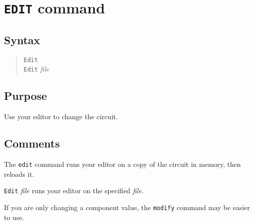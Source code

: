 %
%
%
%
\section{{\tt EDIT} command}
\subsection{Syntax}
\begin{verse}
{\tt Edit} \\
{\tt Edit} {\it file}
\end{verse}
\subsection{Purpose}

Use your editor to change the circuit.
\subsection{Comments}

The {\tt edit} command runs your editor on a copy of the circuit in memory, 
then reloads it.

{\tt Edit} {\it file} runs your editor on the specified {\it file}.

If you are only changing a component value, the {\tt modify} command may be
easier to use.

